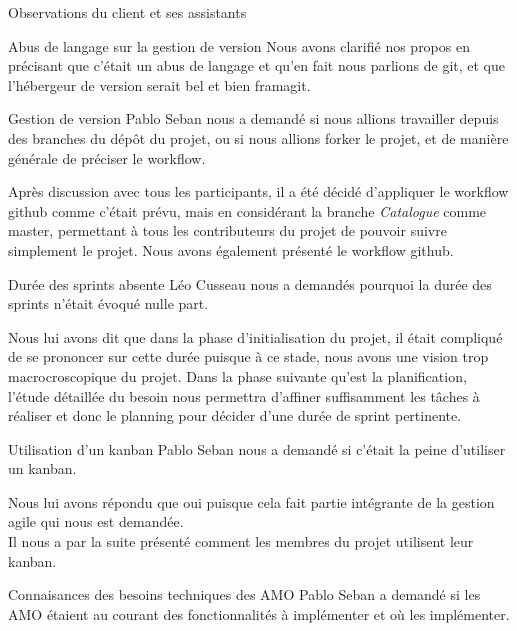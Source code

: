 \documentclass[]{article}
\begin{document}
\begin{section}{Observations du client et ses assistants}
\begin{subsection}{Abus de langage sur la gestion de version}
            Nous avons clarifié nos propos en précisant que c'était un abus de langage et qu'en fait nous parlions de git, et 
            que l'hébergeur de version serait bel et bien framagit.
        \end{subsection}

        \begin{subsection}{Gestion de version}
            Pablo Seban nous a demandé si nous allions travailler depuis des branches du dépôt du projet, ou si nous allions
            forker le projet, et de manière générale de préciser le workflow.

            Après discussion avec tous les participants, il a été décidé d'appliquer le workflow github comme c'était prévu, 
            mais en considérant la branche \emph{Catalogue} comme master, permettant à tous les contributeurs du projet de 
            pouvoir suivre simplement le projet. Nous avons également présenté le workflow github.
        \end{subsection}

        \begin{subsection}{Durée des sprints absente}
            Léo Cusseau nous a demandés pourquoi la durée des sprints n'était évoqué nulle part.

            Nous lui avons dit que dans la phase d'initialisation du projet, il était compliqué de se prononcer sur cette durée 
            puisque à ce stade, nous avons une vision trop macrocroscopique du projet. Dans la phase suivante qu'est la planification, 
            l'étude détaillée du besoin nous permettra d'affiner suffisamment les tâches à réaliser et donc le planning pour 
            décider d'une durée de sprint pertinente.
        \end{subsection}

        \begin{subsection}{Utilisation d'un kanban}
            Pablo Seban nous a demandé si c'était la peine d'utiliser un kanban.

            Nous lui avons répondu que oui puisque cela fait partie intégrante de la gestion agile qui nous est demandée.\\
            Il nous a par la suite présenté comment les membres du projet utilisent leur kanban.
        \end{subsection}

        \begin{subsection}{Connaisances des besoins techniques des AMO}
            Pablo Seban a demandé si les AMO étaient au courant des fonctionnalités à implémenter et où les implémenter.


\end{subsection}
\end{section}
\end{document}

